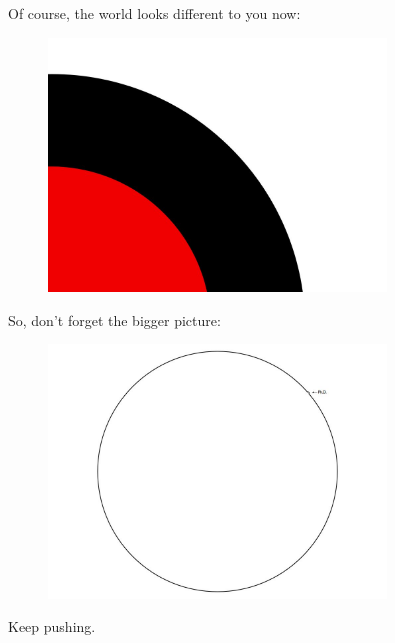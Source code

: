\documentclass[10pt]{beamer}
\begin{document}
\begin{frame}{}
  Of course, the world looks different to you now:
  \begin{figure}[hb]
    \centering
    \includegraphics[width=0.8\textwidth]{images/PhDKnowledge-011.png}
  \end{figure}
\end{frame}


\begin{frame}{}
  So, don't forget the bigger picture:
  \begin{figure}[hb]
    \centering
    \includegraphics[width=0.8\textwidth]{./images/PhDKnowledge-012.png}
  \end{figure}
\end{frame}

\begin{frame}{}
  \Huge Keep pushing.
\end{frame}
\end{document}
